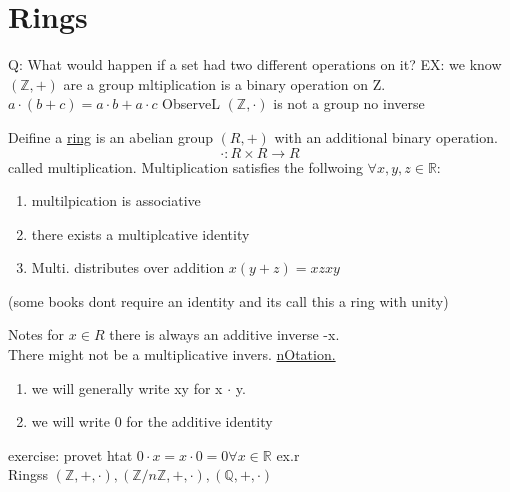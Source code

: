\documentclass{article}
\begin{document}
\section*{Rings}
Q: What would happen if a set had two different operations on it? 
EX: we know $(\mathbb{Z}, +)$ are a group mltiplication is a binary operation on Z. $a \cdot (b + c) = a\cdot b + a \cdot c$
ObserveL $(\mathbb{Z}, \cdot )$ is not a group no inverse \\
\begin{definition}
    Deifine a \underline{ring} is an abelian group $(R, +)$ with an additional binary operation. 
    $$\cdot: R \times R \to R$$ called multiplication. Multiplication satisfies the follwoing $\forall x,y,z \in \mathbb{R}$: 
    \begin{enumerate}
        \item multilpication is associative
        \item there exists a multiplcative identity
        \item Multi. distributes over addition $x(y + z) = xz xy$ 
    \end{enumerate}
    (some books dont require an identity and its call this a ring with unity)
\end{definition}

Notes for $x \in R$ there is always an additive inverse -x. \\ 
There might not be a multiplicative invers.
\underline{nOtation.}
 \begin{enumerate}
    \item we will generally write xy for x $\cdot$ y.
    \item we will write 0 for the additive identity 
\end{enumerate}

exercise: provet htat $0 \cdot x = x \cdot 0 = 0 \forall x \in \mathbb{R}$
ex.r \\ 
Ringss $(\mathbb{Z}, +, \cdot), (\mathbb{Z}/ n\mathbb{Z}, + , \cdot), (\mathbb{Q}, + , \cdot)$
\end{document}
